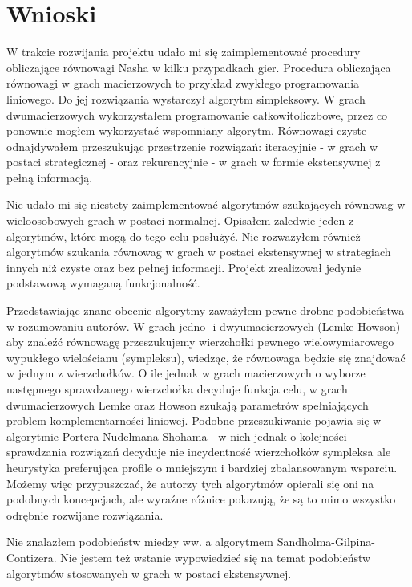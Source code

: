 \documentclass[polish]{standalone}
\begin{document}
\pagestyle{headings}

\chapter{Wnioski}

W trakcie rozwijania projektu udało mi się zaimplementować procedury obliczające równowagi Nasha w kilku przypadkach
gier. Procedura obliczająca równowagi w grach macierzowych to przykład zwykłego programowania liniowego. Do jej
rozwiązania wystarczył algorytm simpleksowy. W grach dwumacierzowych wykorzystałem programowanie całkowitoliczbowe,
przez co ponownie mogłem wykorzystać wspomniany algorytm. Równowagi czyste odnajdywałem przeszukując przestrzenie
rozwiązań: iteracyjnie - w grach w postaci strategicznej - oraz rekurencyjnie - w grach w formie ekstensywnej z pełną
informacją.

Nie udało mi się niestety zaimplementować algorytmów szukających równowag w wieloosobowych grach w postaci normalnej.
Opisałem zaledwie jeden z algorytmów, które mogą do tego celu posłużyć. Nie rozważyłem również algorytmów szukania
równowag w grach w postaci ekstensywnej w strategiach innych niż czyste oraz bez pełnej informacji. Projekt zrealizował
jedynie podstawową wymaganą funkcjonalność.

Przedstawiając znane obecnie algorytmy zaważyłem pewne drobne podobieństwa w rozumowaniu autorów. W grach jedno- i
dwyumacierzowych (Lemke-Howson) aby znaleźć równowagę przeszukujemy wierzchołki pewnego wielowymiarowego wypukłego
wielościanu (sympleksu), wiedząc, że równowaga będzie się znajdować w jednym z wierzchołków. O ile jednak w grach
macierzowych o wyborze następnego sprawdzanego wierzchołka decyduje funkcja celu, w grach dwumacierzowych Lemke oraz
Howson szukają parametrów spełniających problem komplementarności liniowej. Podobne przeszukiwanie pojawia się w
algorytmie Portera-Nudelmana-Shohama - w nich jednak o kolejności sprawdzania rozwiązań decyduje nie incydentność
wierzchołków sympleksa ale heurystyka preferująca profile o mniejszym i bardziej zbalansowanym wsparciu. Możemy więc
przypuszczać, że autorzy tych algorytmów opierali się oni na podobnych koncepcjach, ale wyraźne różnice pokazują, że są
to mimo wszystko odrębnie rozwijane rozwiązania.

Nie znalazłem podobieństw miedzy ww. a algorytmem Sandholma-Gilpina-Contizera. Nie jestem też wstanie wypowiedzieć się
na temat podobieństw algorytmów stosowanych w grach w postaci ekstensywnej.
\end{document}
